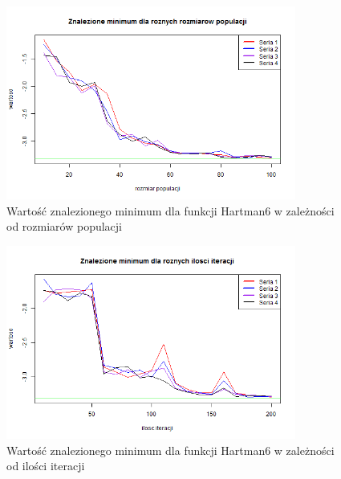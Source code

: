 \documentclass[11pt, a4paper]{article}
\begin{document}
\begin{figure}[H]
	\begin{center}
		\includegraphics[width=0.85\textwidth]{./assets/Hartman64.png}
		\caption{Wartość znalezionego minimum dla funkcji Hartman6 w zależności od rozmiarów populacji}
		\label{fig:hartman64}
	\end{center}
\end{figure}

\begin{figure}[H]
	\begin{center}
		\includegraphics[width=0.85\textwidth]{./assets/Hartman65.png}
		\caption{Wartość znalezionego minimum dla funkcji Hartman6 w zależności od ilości iteracji}
		\label{fig:hartman65}
	\end{center}
\end{figure}
\end{document}
